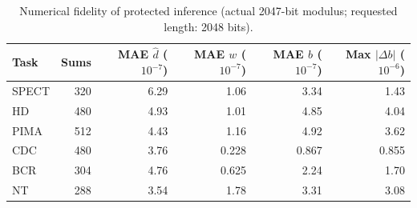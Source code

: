 \begin{table}[!t]
\centering
\caption{Numerical fidelity of protected inference (actual 2047-bit modulus; requested length: 2048 bits).}
\label{tab:ja-he-correctness}
\scriptsize
\setlength{\tabcolsep}{2pt}
\begin{tabular*}{\columnwidth}{@{\extracolsep{\fill}}lrrrrr@{}}
\toprule
Task & Sums & \shortstack{MAE $\hat d$\\($10^{-7}$)} & \shortstack{MAE $w$\\($10^{-7}$)} & \shortstack{MAE $b$\\($10^{-7}$)} & \shortstack{Max $|\Delta b|$\\($10^{-6}$)} \\
\midrule
SPECT & 320 & 6.29 & 1.06 & 3.34 & 1.43 \\
HD & 480 & 4.93 & 1.01 & 4.85 & 4.04 \\
PIMA & 512 & 4.43 & 1.16 & 4.92 & 3.62 \\
CDC & 480 & 3.76 & 0.228 & 0.867 & 0.855 \\
BCR & 304 & 4.76 & 0.625 & 2.24 & 1.70 \\
NT & 288 & 3.54 & 1.78 & 3.31 & 3.08 \\
\bottomrule
\end{tabular*}
\end{table}
